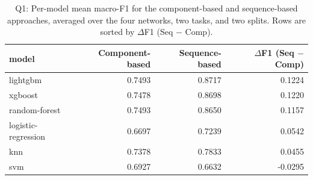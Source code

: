 \begin{table}
\caption{Q1: Per-model mean macro-F1 for the component-based and sequence-based approaches, averaged over the four networks, two tasks, and two splits. Rows are sorted by $\Delta$F1 (Seq $-$ Comp).}
\label{tab:q1_per_model}
\begin{tabular}{lrrr}
\toprule
model & Component-based & Sequence-based & $\Delta$F1 (Seq $-$ Comp) \\
\midrule
lightgbm & 0.7493 & 0.8717 & 0.1224 \\
xgboost & 0.7478 & 0.8698 & 0.1220 \\
random-forest & 0.7493 & 0.8650 & 0.1157 \\
logistic-regression & 0.6697 & 0.7239 & 0.0542 \\
knn & 0.7378 & 0.7833 & 0.0455 \\
svm & 0.6927 & 0.6632 & -0.0295 \\
\bottomrule
\end{tabular}
\end{table}
